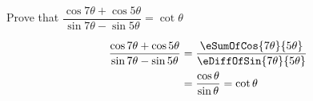 

\question[1] Prove that $\dfrac{\cos 7\theta + \cos 5\theta}{\sin 7\theta - \sin 5\theta} = \cot\theta$


\ifprintanswers
\fi 

\begin{solution}[\mcq]
	\begin{align}
		\dfrac{\cos 7\theta + \cos 5\theta}{\sin 7\theta - \sin 5\theta} &= 
		\dfrac{\eSumOfCos{7\theta}{5\theta}}{\eDiffOfSin{7\theta}{5\theta}} \\
		&= \dfrac{\cos\theta}{\sin\theta} = \cot\theta
	\end{align}
\end{solution}
